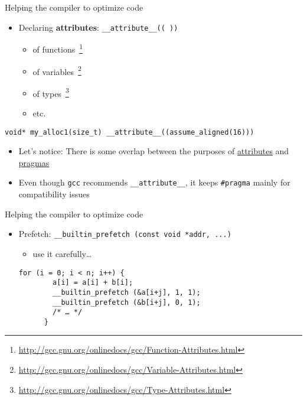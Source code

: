 \documentclass[10pt,xcolor=table]{beamer}
\begin{document}
\begin{frame}[fragile]{Helping the compiler to optimize code}

  \begin{itemize}
  \item Declaring {\bf attributes}: \hfil {\tt \_\_attribute\_\_(( ))}
    \begin{itemize}
    \item of functions~\footnote{\url{http://gcc.gnu.org/onlinedocs/gcc/Function-Attributes.html}}
    \item of variables~\footnote{\url{http://gcc.gnu.org/onlinedocs/gcc/Variable-Attributes.html}}
    \item of types~\footnote{\url{http://gcc.gnu.org/onlinedocs/gcc/Type-Attributes.html}}
    \item etc.
    \end{itemize}
  \end{itemize}

  \begin{lstlisting}[style=c,gobble=2,caption={Example: assume an
      aligned pointer is returned}]
    void* my_alloc1(size_t) __attribute__((assume_aligned(16)))
  \end{lstlisting}

  \pause

  \begin{itemize}
  \item Let's notice: There is some overlap between the purposes of
    \underline{attributes} and \underline{pragmas}
  \item Even though {\tt gcc} recommends {\tt \_\_attribute\_\_}, it
    keeps {\tt \#pragma} mainly for compatibility issues
  \end{itemize}


\end{frame}

\begin{frame}[fragile]{Helping the compiler to optimize code}

  \begin{itemize}
  \item Prefetch: {\footnotesize \tt \_\_builtin\_prefetch (const void
      *addr, ...)}
    \begin{itemize}
    \item use it carefully\ldots
    \end{itemize}

    \begin{lstlisting}[style=c,gobble=2,caption={Prefetching example}]
      for (i = 0; i < n; i++) {
        a[i] = a[i] + b[i];
        __builtin_prefetch (&a[i+j], 1, 1);
        __builtin_prefetch (&b[i+j], 0, 1);
        /* … */
      }
    \end{lstlisting}
  \end{itemize}

\end{frame}
\end{document}
